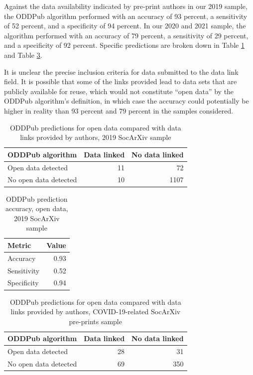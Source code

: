 \documentclass[
]{article}
\begin{document}
Against the data availability indicated by pre-print authors in our 2019 sample, the ODDPub algorithm performed with an accuracy of 93 percent, a sensitivity of 52 percent, and a specificity of 94 percent. In our 2020 and 2021 sample, the algorithm performed with an accuracy of 79 percent, a sensitivity of 29 percent, and a specificity of 92 percent. Specific predictions are broken down in Table \ref{tab:confusion-matrix-2019} and Table \ref{tab:confusion-matrix-2020}.

It is unclear the precise inclusion criteria for data submitted to the data link field. It is possible that some of the links provided lead to data sets that are publicly available for reuse, which would not constitute ``open data'' by the ODDPub algorithm's definition, in which case the accuracy could potentially be higher in reality than 93 percent and 79 percent in the samples considered.

\begin{table}

\caption{\label{tab:confusion-matrix-2019}ODDPub predictions for open data compared with data links provided by authors, 2019 SocArXiv sample}
\centering
\begin{tabular}[t]{l|r|r}
\hline
ODDPub algorithm & Data linked & No data linked\\
\hline
Open data detected & 11 & 72\\
\hline
No open data detected & 10 & 1107\\
\hline
\end{tabular}
\end{table}

\begin{table}

\caption{\label{tab:accuracy-2019}ODDPub prediction accuracy, open data, 2019 SocArXiv sample}
\centering
\begin{tabular}[t]{l|r}
\hline
Metric & Value\\
\hline
Accuracy & 0.93\\
\hline
Sensitivity & 0.52\\
\hline
Specificity & 0.94\\
\hline
\end{tabular}
\end{table}

\begin{table}

\caption{\label{tab:confusion-matrix-2020}ODDPub predictions for open data compared with data links provided by authors, COVID-19-related SocArXiv pre-prints sample}
\centering
\begin{tabular}[t]{l|r|r}
\hline
ODDPub algorithm & Data linked & No data linked\\
\hline
Open data detected & 28 & 31\\
\hline
No open data detected & 69 & 350\\
\hline
\end{tabular}
\end{table}
\end{document}
